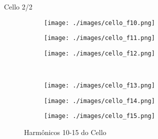 \documentclass{beamer}
\begin{document}
\begin{frame}{Cello 2/2}
\vspace{-1 cm}
\begin{figure}
  \begin{subfigure}[b]{.15\linewidth}
    \caption*{}
    \texttt{[image: ./images/cello\_f10.png]}
  \end{subfigure}
  \hspace{2 cm}
  \begin{subfigure}[b]{.15\linewidth}
    \caption*{} 
    \texttt{[image: ./images/cello\_f11.png]}
  \end{subfigure}
\hspace{2 cm}
  \begin{subfigure}[b]{.15\linewidth}
    \caption*{} 
    \texttt{[image: ./images/cello\_f12.png]}
  \end{subfigure}  
  \\ \vspace{-0.5 cm}
  \begin{subfigure}[b]{.15\linewidth}
    \caption*{}
    \texttt{[image: ./images/cello\_f13.png]}
  \end{subfigure}
  \hspace{2 cm}
  \begin{subfigure}[b]{.15\linewidth}
    \caption*{} 
    \texttt{[image: ./images/cello\_f14.png]}
  \end{subfigure}
\hspace{2 cm}
  \begin{subfigure}[b]{.15\linewidth}
    \caption*{} 
    \texttt{[image: ./images/cello\_f15.png]}
  \end{subfigure}  
\caption{Harmônicos 10-15 do Cello}
\end{figure}
\end{frame}
\end{document}
